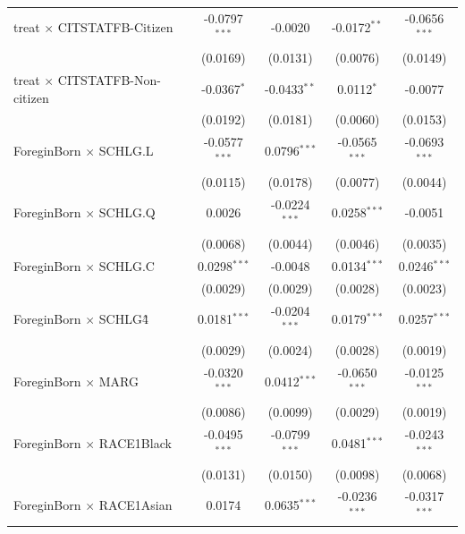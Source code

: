 \begin{tabular}{lcccc}
   treat $\times$ CITSTATFB-Citizen          & -0.0797$^{***}$ & -0.0020         & -0.0172$^{**}$  & -0.0656$^{***}$\\   
                                             & (0.0169)        & (0.0131)        & (0.0076)        & (0.0149)\\   
   treat $\times$ CITSTATFB-Non-citizen      & -0.0367$^{*}$   & -0.0433$^{**}$  & 0.0112$^{*}$    & -0.0077\\   
                                             & (0.0192)        & (0.0181)        & (0.0060)        & (0.0153)\\   
   ForeginBorn $\times$ SCHLG.L              & -0.0577$^{***}$ & 0.0796$^{***}$  & -0.0565$^{***}$ & -0.0693$^{***}$\\   
                                             & (0.0115)        & (0.0178)        & (0.0077)        & (0.0044)\\   
   ForeginBorn $\times$ SCHLG.Q              & 0.0026          & -0.0224$^{***}$ & 0.0258$^{***}$  & -0.0051\\   
                                             & (0.0068)        & (0.0044)        & (0.0046)        & (0.0035)\\   
   ForeginBorn $\times$ SCHLG.C              & 0.0298$^{***}$  & -0.0048         & 0.0134$^{***}$  & 0.0246$^{***}$\\   
                                             & (0.0029)        & (0.0029)        & (0.0028)        & (0.0023)\\   
   ForeginBorn $\times$ SCHLG\^4             & 0.0181$^{***}$  & -0.0204$^{***}$ & 0.0179$^{***}$  & 0.0257$^{***}$\\   
                                             & (0.0029)        & (0.0024)        & (0.0028)        & (0.0019)\\   
   ForeginBorn $\times$ MARG                 & -0.0320$^{***}$ & 0.0412$^{***}$  & -0.0650$^{***}$ & -0.0125$^{***}$\\   
                                             & (0.0086)        & (0.0099)        & (0.0029)        & (0.0019)\\   
   ForeginBorn $\times$ RACE1Black           & -0.0495$^{***}$ & -0.0799$^{***}$ & 0.0481$^{***}$  & -0.0243$^{***}$\\   
                                             & (0.0131)        & (0.0150)        & (0.0098)        & (0.0068)\\   
   ForeginBorn $\times$ RACE1Asian           & 0.0174          & 0.0635$^{***}$  & -0.0236$^{***}$ & -0.0317$^{***}$\\   

\end{tabular}
